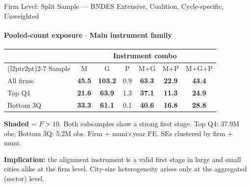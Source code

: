 \documentclass[aspectratio=169,10pt]{beamer}
\newcommand{\fpass}[1]{\cellcolor{pass}\textbf{#1}}
\begin{document}
\begin{frame}[t]{Firm Level: Split Sample --- BNDES Extensive, Coalition, Cycle-specific, Unweighted}
\framesubtitle{Pooled-count exposure $\cdot$ Main instrument family}
\begin{center}
\footnotesize
\setlength{\tabcolsep}{4pt}
\renewcommand{\arraystretch}{1.05}
\begin{tabular}{@{}lcccccc@{}}
\toprule
 & \multicolumn{6}{c}{Instrument combo} \\
\cmidrule(l{2pt}r{2pt}){2-7}
Sample & M & G & P & M+G & M+P & M+G+P \\
\midrule
All firms  & \fpass{45.5} & \fpass{103.2} & 0.9 & \fpass{63.3} & \fpass{22.9} & \fpass{43.4} \\
Top Q4     & \fpass{21.6} & \fpass{63.9}  & 1.3 & \fpass{37.1} & \fpass{11.3} & \fpass{24.9} \\
Bottom 3Q  & \fpass{33.3} & \fpass{61.1}  & 0.1 & \fpass{40.6} & \fpass{16.8} & \fpass{28.8} \\
\bottomrule
\end{tabular}
\end{center}
{\scriptsize \colorbox{pass}{\textbf{Shaded}} = $F>10$.
Both subsamples show a strong first stage.  Top Q4: 37.9M obs; Bottom 3Q: 5.2M obs.
Firm + muni$\times$year FE. SEs clustered by firm + muni.}
\vspace{0.8em}

\textcolor{alertred}{\footnotesize\textbf{Implication:} the alignment instrument is a valid first stage in large and small cities alike at the firm level.  City-size heterogeneity arises only at the aggregated (sector) level.}
\end{frame}

\end{document}
